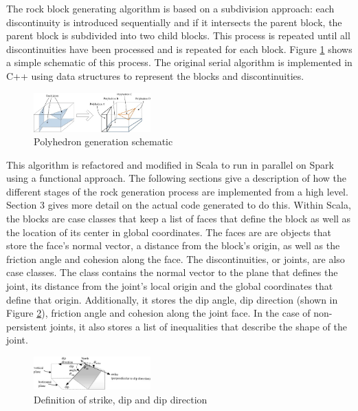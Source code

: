 The rock block generating algorithm is based on a subdivision approach: each discontinuity is introduced sequentially and if it intersects the parent block, the parent block is subdivided into two child blocks. This process is repeated until all discontinuities have been processed and is repeated for each block. Figure \ref{fig:SlicingIllustration} shows a simple schematic of this process. The original serial algorithm is implemented in C++ using data structures to represent the blocks and discontinuities. \par

\begin{figure}[h]
  \centering
  \includegraphics[width=0.4\textwidth]{SlicingIllustration}
  \caption{Polyhedron generation schematic \cite{slicing}}
  \label{fig:SlicingIllustration}
\end{figure}

This algorithm is refactored and modified in Scala to run in parallel on Spark using a functional approach. The following sections give a description of how the different stages of the rock generation process are implemented from a high level. Section 3 gives more detail on the actual code generated to do this.  Within Scala, the blocks are case classes that keep a list of faces that define the block as well as the location of its center in global coordinates. The faces are are objects that store the face's normal vector, a distance from the block's origin, as well as the friction angle and cohesion along the face. The discontinuities, or joints, are also case classes. The class contains the normal vector to the plane that defines the joint, its distance from the joint's local origin and the global coordinates that define that origin. Additionally, it stores the dip angle, dip direction (shown in Figure \ref{fig:DipFig}), friction angle and cohesion along the joint face. In the case of non-persistent joints, it also stores a list of inequalities that describe the shape of the joint.

\begin {figure}[h]
  \centering
  \includegraphics[width=0.4\textwidth]{DipFig}
  \caption{Definition of strike, dip and dip direction \cite{slicing}}
  \label{fig:DipFig}
\end{figure}

